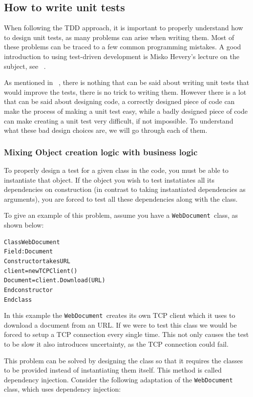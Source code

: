 \subsection{How to write unit tests}

When following the TDD approach, it is important to properly understand
how to design unit tests, as many problems can arise when writing
them. Most of these problems can be traced to a few common programming
mistakes. A good introduction to using test-driven development is
Misko Hevery's lecture on the subject, see ~\cite{LectureTDD}.

As mentioned in ~\cite{LectureTDD}, there is nothing that can be
said about writing unit tests that would improve the tests, there
is no trick to writing them. However there is a lot that can be said
about designing code, a correctly designed piece of code can make
the process of making a unit test easy, while a badly designed piece
of code can make creating a unit test very difficult, if not impossible.
To understand what these bad design choices are, we will go through
each of them. 


\subsubsection*{Mixing Object creation logic with business logic}

To properly design a test for a given class in the code, you must
be able to instantiate that object. If the object you wish to test
instatiates all its dependencies on construction (in contrast to taking
instantiated dependencies as arguments), you are forced to test all
these dependencies along with the class.

To give an example of this problem, assume you have a \texttt{WebDocument
}class, as shown below:

\begin{alltt}
Class WebDocument 	
    Field: Document 	
    Constructor takes URL 		
        client = new TCPClient() 		
        Document = client.Download(URL)
    Endconstructor 
Endclass
\end{alltt}

In this example the \texttt{WebDocument }creates its own TCP client
which it uses to download a document from an URL. If we were to test
this class we would be forced to setup a TCP connection every single
time. This not only causes the test to be slow it also introduces
uncertainty, as the TCP connection could fail.

This problem can be solved by designing the class so that it requires
the classes to be provided instead of instantiating them itself. This
method is called dependency injection. Consider the following adaptation
of the \texttt{WebDocument} class, which uses dependency injection:

